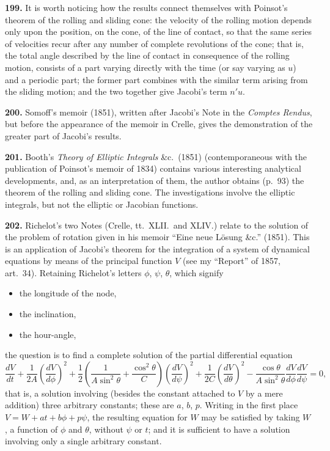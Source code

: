 \documentclass[11pt,a4paper]{book}
\begin{document}
\textbf{199.} It is worth noticing how the results connect themselves with Poinsot's theorem of the rolling and sliding cone: the velocity of the rolling motion depends only upon the position, on the cone, of the line of contact, so that the same series of velocities recur after any number of complete revolutions of the cone; that is, the total angle described by the line of contact in consequence of the rolling motion, consists of a part varying directly with the time (or say varying as $u$) and a periodic part; the former part combines with the similar term arising from the sliding motion; and the two together give Jacobi's term $n'u$.

\textbf{200.} Somoff's memoir (1851), written after Jacobi's Note in the \textit{Comptes Rendus}, but before the appearance of the memoir in Crelle, gives the demonstration of the greater part of Jacobi's results.

\textbf{201.} Booth's \textit{Theory of Elliptic Integrals} \&c.\ (1851) (contemporaneous with the publication of Poinsot's memoir of 1834) contains various interesting analytical developments, and, as an interpretation of them, the author obtains (p.~93) the theorem of the rolling and sliding cone. The investigations involve the elliptic integrals, but not the elliptic or Jacobian functions.

\textbf{202.} Richelot's two Notes (Crelle, tt.~XLII.\ and XLIV.) relate to the solution of the problem of rotation given in his memoir ``Eine neue L\"osung \&c.'' (1851). This is an application of Jacobi's theorem for the integration of a system of dynamical equations by means of the principal function $V$ (see my ``Report'' of 1857, art.~34). Retaining Richelot's letters $\phi$, $\psi$, $\theta$, which signify
\begin{itemize}[nosep]
    \item[$\phi$,] the longitude of the node,
    \item[$\theta$,] the inclination,
    \item[$\psi$,] the hour-angle,
\end{itemize}
the question is to find a complete solution of the partial differential equation
\[
\frac{dV}{dt} + \frac{1}{2A}\left(\frac{dV}{d\phi}\right)^2 + \frac{1}{2}\left(\frac{1}{A\sin^2\theta} + \frac{\cos^2\theta}{C}\right)\left(\frac{dV}{d\psi}\right)^2 + \frac{1}{2C}\left(\frac{dV}{d\theta}\right)^2 - \frac{\cos\theta}{A\sin^2\theta}\frac{dV}{d\phi}\frac{dV}{d\psi} = 0,
\]
that is, a solution involving (besides the constant attached to $V$ by a mere addition) three arbitrary constants; these are $a$, $b$, $p$. Writing in the first place $V = W + at + b\phi + p\psi$, the resulting equation for $W$ may be satisfied by taking $W$, a function of $\phi$ and $\theta$, without $\psi$ or $t$; and it is sufficient to have a solution involving only a single arbitrary constant.
\end{document}
